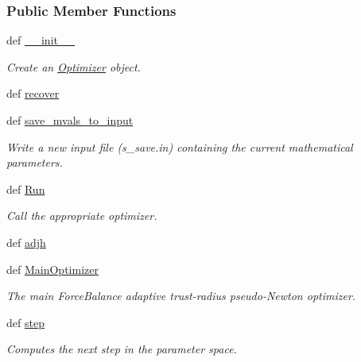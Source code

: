 \subsubsection*{Public Member Functions}
\begin{DoxyCompactItemize}
\item 
def \hyperlink{classforcebalance_1_1optimizer_1_1Optimizer_a674f1c17cbfaffa7955fb5d833d33e0b}{\-\_\-\-\_\-init\-\_\-\-\_\-}
\begin{DoxyCompactList}\small\item\em Create an \hyperlink{classforcebalance_1_1optimizer_1_1Optimizer}{Optimizer} object. \end{DoxyCompactList}\item 
def \hyperlink{classforcebalance_1_1optimizer_1_1Optimizer_ab5e036a7f2df4b98b33094daf3686bae}{recover}
\item 
def \hyperlink{classforcebalance_1_1optimizer_1_1Optimizer_ae3f27275a82c705b24bd761e70eeef65}{save\-\_\-mvals\-\_\-to\-\_\-input}
\begin{DoxyCompactList}\small\item\em Write a new input file (s\-\_\-save.\-in) containing the current mathematical parameters. \end{DoxyCompactList}\item 
def \hyperlink{classforcebalance_1_1optimizer_1_1Optimizer_a85688c895ce936fa4368d9e2f7fcb4b5}{Run}
\begin{DoxyCompactList}\small\item\em Call the appropriate optimizer. \end{DoxyCompactList}\item 
def \hyperlink{classforcebalance_1_1optimizer_1_1Optimizer_a0888d8ccc5f89aef8d2fcb40fc3dd599}{adjh}
\item 
def \hyperlink{classforcebalance_1_1optimizer_1_1Optimizer_a1d222f82239075ea0d6b9294b2f50e12}{Main\-Optimizer}
\begin{DoxyCompactList}\small\item\em The main Force\-Balance adaptive trust-\/radius pseudo-\/\-Newton optimizer. \end{DoxyCompactList}\item 
def \hyperlink{classforcebalance_1_1optimizer_1_1Optimizer_aacc231ff56f5d87597a95f4e543360a2}{step}
\begin{DoxyCompactList}\small\item\em Computes the next step in the parameter space. \end{DoxyCompactList}\item 

\end{DoxyCompactItemize}
